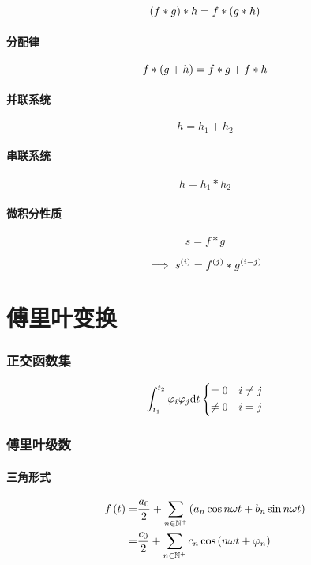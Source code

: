 \documentclass{article}
\begin{document}
\[\left(f\ast g\right)\ast h=f\ast\left(g\ast h\right)\]

\subsection{分配律}

\[f\ast\left(g+h\right)=f\ast g+f\ast h\]

\subsection{并联系统}

\[h=h_1+h_2\]

\subsection{串联系统}

\[h=h_1\ast h_2\]

\subsection{微积分性质}

\[s=f\ast g\]

\[\implies s^{\left(i\right)}=f^{\left(j\right)}\ast g^{\left(i-j\right)}\]

\part{傅里叶变换}

\section{正交函数集}

\[\int_{t_1}^{t_2}\varphi_i\varphi_j\mathrm d t
    \left\{\begin{aligned}
        =0    &  & i\neq j \\
        \neq0 &  & i=j
    \end{aligned}\right.\]

\section{傅里叶级数}

\subsection{三角形式}

\[\begin{aligned}
        f\left(t\right)
        = & \frac{a_0}2+\sum_{n\in\mathbb N^+}\left(a_n\cos n\omega t+b_n\sin n\omega t\right) \\
        = & \frac{c_0}2+\sum_{n\in\mathbb N^+}c_n\cos\left(n\omega t+\varphi_n\right)
    \end{aligned}\]
\end{document}
